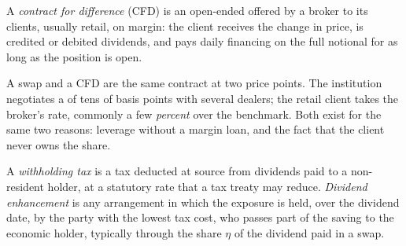 \begin{omfigure}

\label{fig:m1:delta-one-instruments:swap}
\end{omfigure}

\begin{definition}\label{def:m1:delta-one-instruments:cfd}
A \emph{contract for difference} (CFD) is an
open-ended  offered by a broker to its clients, usually retail,
on margin: the client receives the change in price, is credited or debited
dividends, and pays daily financing on the full notional for as long as the
position is open.
\end{definition}

A swap and a CFD are the same contract at two price points. The institution
negotiates a  of tens of basis points with several dealers; the
retail client takes the broker's rate, commonly a few \emph{percent} over
the benchmark. Both exist for the same two reasons: leverage without a margin
loan, and the fact that the client never owns the share.

\begin{definition}\label{def:m1:delta-one-instruments:wht}
A \emph{withholding tax} is a tax deducted at source
from dividends paid to a non-resident holder, at a statutory rate that a tax
treaty may reduce. \emph{Dividend enhancement} is
any arrangement in which the exposure is held, over the dividend date, by the
party with the lowest tax cost, who passes part of the saving to the
economic holder, typically through the share $\eta$ of the dividend paid in
a swap.
\end{definition}

